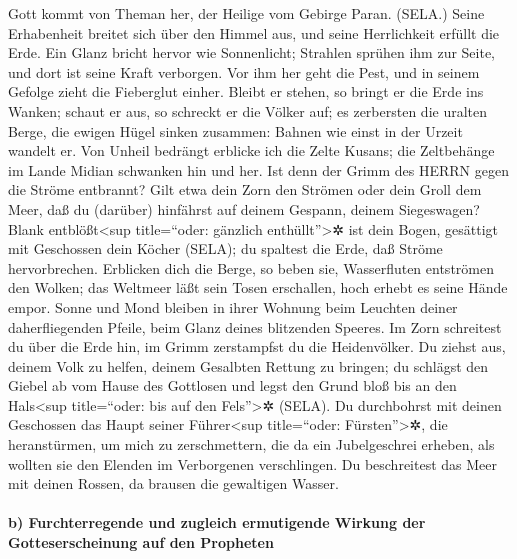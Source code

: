  Gott kommt von Theman her, der Heilige vom Gebirge Paran.
(SELA.) Seine Erhabenheit breitet sich über den Himmel aus, und seine
Herrlichkeit erfüllt die Erde.  Ein Glanz bricht hervor
wie Sonnenlicht; Strahlen sprühen ihm zur Seite, und dort ist seine
Kraft verborgen.  Vor ihm her geht die Pest, und in seinem
Gefolge zieht die Fieberglut einher.  Bleibt er stehen, so
bringt er die Erde ins Wanken; schaut er aus, so schreckt er die Völker
auf; es zerbersten die uralten Berge, die ewigen Hügel sinken zusammen:
Bahnen wie einst in der Urzeit wandelt er.  Von Unheil
bedrängt erblicke ich die Zelte Kusans; die Zeltbehänge im Lande Midian
schwanken hin und her.  Ist denn der Grimm des HERRN gegen
die Ströme entbrannt? Gilt etwa dein Zorn den Strömen oder dein Groll
dem Meer, daß du (darüber) hinfährst auf deinem Gespann, deinem
Siegeswagen?  Blank entblößt\textless sup title=``oder:
gänzlich enthüllt''\textgreater✲ ist dein Bogen, gesättigt mit
Geschossen dein Köcher (SELA); du spaltest die Erde, daß Ströme
hervorbrechen.  Erblicken dich die Berge, so beben sie,
Wasserfluten entströmen den Wolken; das Weltmeer läßt sein Tosen
erschallen, hoch erhebt es seine Hände empor.  Sonne und
Mond bleiben in ihrer Wohnung beim Leuchten deiner daherfliegenden
Pfeile, beim Glanz deines blitzenden Speeres.  Im Zorn
schreitest du über die Erde hin, im Grimm zerstampfst du die
Heidenvölker.  Du ziehst aus, deinem Volk zu helfen,
deinem Gesalbten Rettung zu bringen; du schlägst den Giebel ab vom Hause
des Gottlosen und legst den Grund bloß bis an den Hals\textless sup
title=``oder: bis auf den Fels''\textgreater✲ (SELA).  Du
durchbohrst mit deinen Geschossen das Haupt seiner Führer\textless sup
title=``oder: Fürsten''\textgreater✲, die heranstürmen, um mich zu
zerschmettern, die da ein Jubelgeschrei erheben, als wollten sie den
Elenden im Verborgenen verschlingen.  Du beschreitest das
Meer mit deinen Rossen, da brausen die gewaltigen Wasser.

\hypertarget{b-furchterregende-und-zugleich-ermutigende-wirkung-der-gotteserscheinung-auf-den-propheten}{%
\paragraph{b) Furchterregende und zugleich ermutigende Wirkung der
Gotteserscheinung auf den
Propheten}\label{b-furchterregende-und-zugleich-ermutigende-wirkung-der-gotteserscheinung-auf-den-propheten}}

